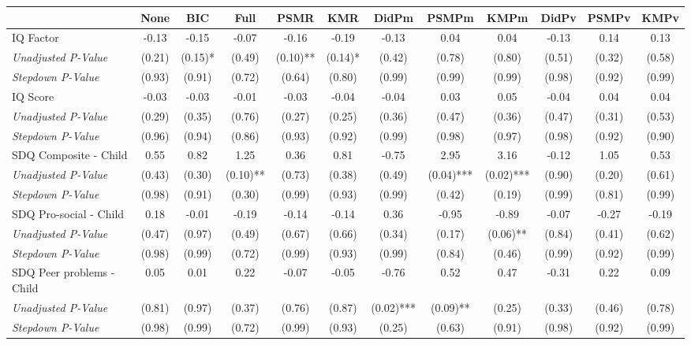 \begin{tabular}{l c c c c c c c c c c c}
\toprule
 & None & BIC & Full & PSMR & KMR & DidPm & PSMPm & KMPm & DidPv & PSMPv & KMPv \\
\midrule
IQ Factor & -0.13 & -0.15 & -0.07 & -0.16 & -0.19 & -0.13 & 0.04 & 0.04 & -0.13 & 0.14 & 0.13 \\
\quad \textit{Unadjusted P-Value} & (0.21) & (0.15)* & (0.49) & (0.10)** & (0.14)* & (0.42) & (0.78) & (0.80) & (0.51) & (0.32) & (0.58) \\
\quad \textit{Stepdown P-Value} & (0.93) & (0.91) & (0.72) & (0.64) & (0.80) & (0.99) & (0.99) & (0.99) & (0.98) & (0.92) & (0.99) \\
IQ Score & -0.03 & -0.03 & -0.01 & -0.03 & -0.04 & -0.04 & 0.03 & 0.05 & -0.04 & 0.04 & 0.04 \\
\quad \textit{Unadjusted P-Value} & (0.29) & (0.35) & (0.76) & (0.27) & (0.25) & (0.36) & (0.47) & (0.36) & (0.47) & (0.31) & (0.53) \\
\quad \textit{Stepdown P-Value} & (0.96) & (0.94) & (0.86) & (0.93) & (0.92) & (0.99) & (0.98) & (0.97) & (0.98) & (0.92) & (0.90) \\
SDQ Composite - Child & 0.55 & 0.82 & 1.25 & 0.36 & 0.81 & -0.75 & 2.95 & 3.16 & -0.12 & 1.05 & 0.53 \\
\quad \textit{Unadjusted P-Value} & (0.43) & (0.30) & (0.10)** & (0.73) & (0.38) & (0.49) & (0.04)*** & (0.02)*** & (0.90) & (0.20) & (0.61) \\
\quad \textit{Stepdown P-Value} & (0.98) & (0.91) & (0.30) & (0.99) & (0.93) & (0.99) & (0.42) & (0.19) & (0.99) & (0.81) & (0.99) \\
SDQ Pro-social - Child & 0.18 & -0.01 & -0.19 & -0.14 & -0.14 & 0.36 & -0.95 & -0.89 & -0.07 & -0.27 & -0.19 \\
\quad \textit{Unadjusted P-Value} & (0.47) & (0.97) & (0.49) & (0.67) & (0.66) & (0.34) & (0.17) & (0.06)** & (0.84) & (0.41) & (0.62) \\
\quad \textit{Stepdown P-Value} & (0.98) & (0.99) & (0.72) & (0.99) & (0.93) & (0.99) & (0.84) & (0.46) & (0.99) & (0.92) & (0.99) \\
SDQ Peer problems - Child & 0.05 & 0.01 & 0.22 & -0.07 & -0.05 & -0.76 & 0.52 & 0.47 & -0.31 & 0.22 & 0.09 \\
\quad \textit{Unadjusted P-Value} & (0.81) & (0.97) & (0.37) & (0.76) & (0.87) & (0.02)*** & (0.09)** & (0.25) & (0.33) & (0.46) & (0.78) \\
\quad \textit{Stepdown P-Value} & (0.98) & (0.99) & (0.72) & (0.99) & (0.93) & (0.25) & (0.63) & (0.91) & (0.98) & (0.92) & (0.99) \\

\end{tabular}
